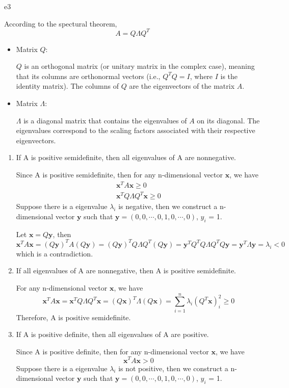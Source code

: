 \documentclass{article}
\newcommand{\xB}{\mathbf{x}}
\newcommand{\yB}{\mathbf{y}}
\begin{document}
\begin{PROOF}{e3}

	According to the spectural theorem, 
	\[
		A = Q \Lambda Q^T
	\]
	\begin{itemize}
	 	\item Matrix \( Q \):
		
		\( Q \) is an orthogonal matrix (or unitary matrix in the complex case), meaning that its columns are orthonormal vectors (i.e., \( Q^T Q = I \), where \( I \) is the identity matrix). The columns of \( Q \) are the eigenvectors of the matrix \( A \).
	 
	 	\item Matrix \( \Lambda \):
		
		\( \Lambda \) is a diagonal matrix that contains the eigenvalues of \( A \) on its diagonal. The eigenvalues correspond to the scaling factors associated with their respective eigenvectors.
	 
	\end{itemize}

	\begin{enumerate}
		\item If A is positive semidefinite, then all eigenvalues of A are nonnegative.
		
		Since A is positive semidefinite, then for any n-dimensional vector $\xB$, we have
		\[
		\begin{aligned}
			\xB^T A \xB \geq 0\\ 
			\xB^T Q \Lambda Q^T \xB \geq 0
		\end{aligned}
		\]
		Suppose there is a eigenvalue $\lambda_i$ is negative, then we construct a 
		n-dimensional vector $\yB$ such that $\yB = (0, 0, \cdots, 0, 1, 0, \cdots, 0)$, $y_i$ = 1.

		Let $\xB = Q \yB$, then
		\[
			\xB^T A \xB = (Q\yB)^T A (Q\yB) = (Q\yB)^T Q \Lambda Q^T (Q\yB) = \yB^T Q^T Q \Lambda Q^T Q \yB =  \yB^T \Lambda \yB = \lambda_i < 0	
		\]
		which is a contradiction.
		\item If all eigenvalues of A are nonnegative, then A is positive semidefinite.
		
		For any n-dimensional vector $\xB$, we have
		\[
			\xB^T A \xB = \xB^T Q \Lambda Q^T \xB = (Q\xB)^T \Lambda (Q\xB) = \sum_{i=1}^n \lambda_i (Q^T \xB)_i^2 \geq 0
		\]
		Therefore, A is positive semidefinite.
		\item If A is positive definite, then all eigenvalues of A are positive.
		
		Since A is positive definite, then for any n-dimensional vector $\xB$, we have
		\[
			\xB^T A \xB > 0
		\]
		Suppose there is a eigenvalue $\lambda_i$ is not positive, then we construct a 
		n-dimensional vector $\yB$ such that $\yB = (0, 0, \cdots, 0, 1, 0, \cdots, 0)$, $y_i$ = 1.


\end{enumerate}
\end{PROOF}
\end{document}
